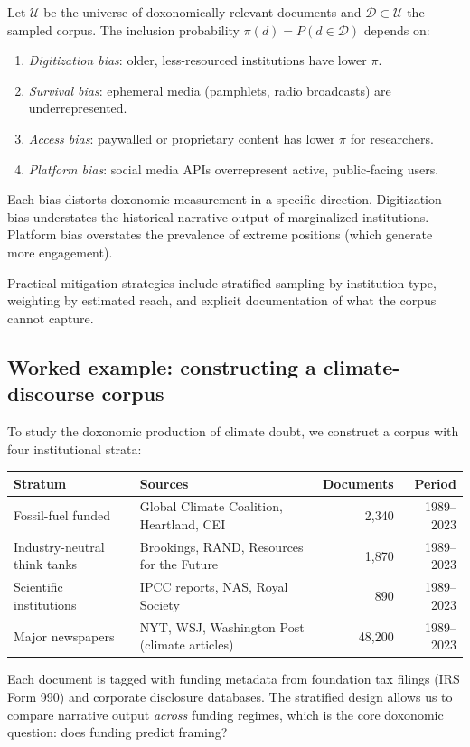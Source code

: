 \begin{proposition}
\label{prop:corpus-bias}
Let $\mathcal{U}$ be the universe of doxonomically relevant documents and $\mathcal{D} \subset \mathcal{U}$ the sampled corpus.
The inclusion probability $\pi(d) = P(d \in \mathcal{D})$ depends on:
\begin{enumerate}[nosep]
  \item \emph{Digitization bias}: older, less-resourced institutions have lower $\pi$.
  \item \emph{Survival bias}: ephemeral media (pamphlets, radio broadcasts) are underrepresented.
  \item \emph{Access bias}: paywalled or proprietary content has lower $\pi$ for researchers.
  \item \emph{Platform bias}: social media APIs overrepresent active, public-facing users.
\end{enumerate}
Each bias distorts doxonomic measurement in a specific direction.
Digitization bias understates the historical narrative output of marginalized institutions.
Platform bias overstates the prevalence of extreme positions (which generate more engagement).
\end{proposition}

Practical mitigation strategies include stratified sampling by institution type, weighting by estimated reach, and explicit documentation of what the corpus cannot capture.

\subsection{Worked example: constructing a climate-discourse corpus}

\begin{example}
\label{ex:climate-corpus}
To study the doxonomic production of climate doubt, we construct a corpus with four institutional strata:

\begin{center}
\begin{tabular}{llrr}
\toprule
Stratum & Sources & Documents & Period \\
\midrule
Fossil-fuel funded & Global Climate Coalition, Heartland, CEI & 2,340 & 1989--2023 \\
Industry-neutral think tanks & Brookings, RAND, Resources for the Future & 1,870 & 1989--2023 \\
Scientific institutions & IPCC reports, NAS, Royal Society & 890 & 1989--2023 \\
Major newspapers & NYT, WSJ, Washington Post (climate articles) & 48,200 & 1989--2023 \\
\bottomrule
\end{tabular}
\end{center}

Each document is tagged with funding metadata from foundation tax filings (IRS Form 990) and corporate disclosure databases.
The stratified design allows us to compare narrative output \emph{across} funding regimes, which is the core doxonomic question: does funding predict framing?
\end{example}

